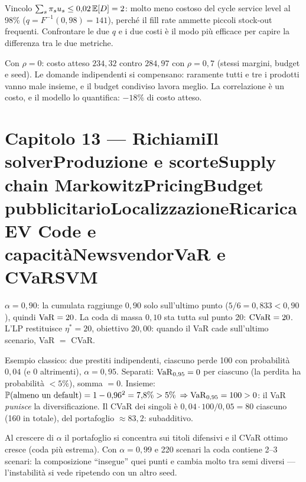 \documentclass[11pt,a4paper]{article}
\newcounter{cap}
\newcounter{sol}[cap]
\newcommand{\capitolo}[1]{\setcounter{cap}{#1}\section*{Capitolo #1 --- \capnome{#1}}}
\newcommand{\capnome}[1]{%
  \ifcase#1\or\or Richiami\or Il solver\or Produzione e scorte\or Supply chain\or
  Markowitz\or Pricing\or Budget pubblicitario\or Localizzazione\or Ricarica EV\or
  Code e capacità\or Newsvendor\or VaR e CVaR\or SVM\fi}
\begin{document}
\begin{soluzione}
Vincolo $\sum_s \pi_s u_s \le 0{,}02\,\mathbb{E}[D] = 2$: molto meno costoso del cycle
service level al 98\% ($q = F^{-1}(0{,}98) = 141$), perché il fill rate ammette
piccoli stock-out frequenti. Confrontare le due $q$ e i due costi è il modo più
efficace per capire la differenza tra le due metriche.
\end{soluzione}

\begin{soluzione}[multiprodotto]
Con $\rho = 0$: costo atteso $234{,}32$ contro $284{,}97$ con $\rho = 0{,}7$ (stessi
margini, budget e seed). Le domande indipendenti si compensano: raramente tutti e tre
i prodotti vanno male insieme, e il budget condiviso lavora meglio. La correlazione
è un costo, e il modello lo quantifica: $-18\%$ di costo atteso.
\end{soluzione}

\capitolo{13}

\begin{soluzione}[verifica]
$\alpha = 0{,}90$: la cumulata raggiunge $0{,}90$ solo sull'ultimo punto
($5/6 = 0{,}833 < 0{,}90$), quindi $\mathrm{VaR} = 20$. La coda di massa $0{,}10$ sta tutta
sul punto 20: $\mathrm{CVaR} = 20$. L'LP restituisce $\eta^* = 20$, obiettivo $20{,}00$:
quando il VaR cade sull'ultimo scenario, VaR $=$ CVaR.
\end{soluzione}

\begin{soluzione}[subadditività]
Esempio classico: due prestiti indipendenti, ciascuno perde 100 con probabilità
$0{,}04$ (e 0 altrimenti), $\alpha = 0{,}95$. Separati:
$\mathrm{VaR}_{0,95} = 0$ per ciascuno (la perdita ha probabilità $< 5\%$), somma $= 0$.
Insieme: $\mathbb{P}(\text{almeno un default}) = 1 - 0{,}96^2 = 7{,}8\% > 5\%$
$\Rightarrow \mathrm{VaR}_{0,95} = 100 > 0$: il VaR \emph{punisce} la diversificazione.
Il CVaR dei singoli è $0{,}04 \cdot 100/0{,}05 = 80$ ciascuno (160 in totale), del
portafoglio $\approx 83{,}2$: subadditivo.
\end{soluzione}

\begin{soluzione}
Al crescere di $\alpha$ il portafoglio si concentra sui titoli difensivi e il CVaR
ottimo cresce (coda più estrema). Con $\alpha = 0{,}99$ e 220 scenari la coda
contiene 2--3 scenari: la composizione ``insegue'' quei punti e cambia molto tra
semi diversi --- l'instabilità si vede ripetendo con un altro seed.
\end{soluzione}
\end{document}

